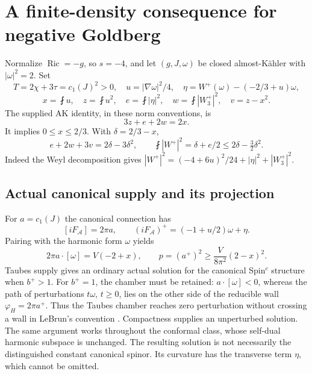\documentclass[11pt,a4paper]{article}
\theoremstyle{remark}\newtheorem{remark}[theorem]{Remark}
\newcommand{\Ric}{\operatorname{Ric}}
\newcommand{\av}{\mathop{\fint}}
\begin{document}
\section{A finite-density consequence for negative Goldberg}
Normalize $\Ric=-g$, so $s=-4$, and let $(g,J,\omega)$ be closed almost-K\"ahler with $|\omega|^2=2$. Set
\[
 T=2\chi+3\tau=c_1(J)^2>0,\quad u=|\nabla\omega|^2/4,
 \quad\eta=W^+(\omega)-(-2/3+u)\omega,
\]
\[
 x=\av u,\quad z=\av u^2,\quad e=\av|\eta|^2,
 \quad w=\av|W_3^+|^2,\quad v=z-x^2.
\]
The supplied AK identity, in these norm conventions, is
\[
 3z+e+2w=2x.
\]
It implies $0\le x\le2/3$. With $\delta=2/3-x$,
\begin{equation}
 e+2w+3v=2\delta-3\delta^2,\qquad
 \av|W^+|^2=\delta+e/2\le2\delta-\tfrac32\delta^2.
 \label{eq:akbalance}
\end{equation}
Indeed the Weyl decomposition gives
$|W^+|^2=(-4+6u)^2/24+|\eta|^2+|W_3^+|^2$.

\subsection{Actual canonical supply and its projection}
For $a=c_1(J)$ the canonical connection has
\[
 [iF_{\mathcal A}]=2\pi a,\qquad
 (iF_{\mathcal A})^+=(-1+u/2)\omega+\eta.
\]
Pairing with the harmonic form $\omega$ yields
\[
 2\pi a\cdot[\omega]=V(-2+x),\qquad
 p=(a^+)^2\ge\frac{V}{8\pi^2}(2-x)^2.
\]
Taubes supply gives an ordinary actual solution for the canonical Spin$^c$ structure when $b^+>1$. For $b^+=1$, the chamber must be retained: $a\cdot[\omega]<0$, whereas the path of perturbations $t\omega$, $t\ge0$, lies on the other side of the reducible wall $\varphi_H=2\pi a^+$. Thus the Taubes chamber reaches zero perturbation without crossing a wall in LeBrun's convention \cite{LeBrunAK}. Compactness supplies an unperturbed solution. The same argument works throughout the conformal class, whose self-dual harmonic subspace is unchanged.
The resulting solution is not necessarily the distinguished constant canonical spinor. Its curvature has the transverse term $\eta$, which cannot be omitted.
\end{document}
